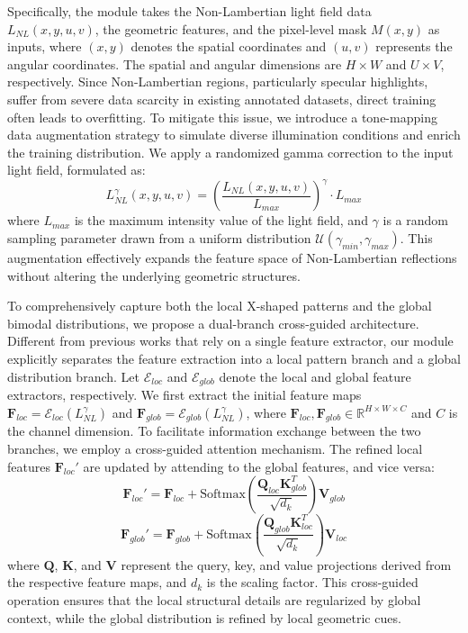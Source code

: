 Specifically, the module takes the Non-Lambertian light field data $L_{NL}(x,y,u,v)$, the geometric features, and the pixel-level mask $M(x,y)$ as inputs, where $(x,y)$ denotes the spatial coordinates and $(u,v)$ represents the angular coordinates. The spatial and angular dimensions are $H \times W$ and $U \times V$, respectively. Since Non-Lambertian regions, particularly specular highlights, suffer from severe data scarcity in existing annotated datasets, direct training often leads to overfitting. To mitigate this issue, we introduce a tone-mapping data augmentation strategy to simulate diverse illumination conditions and enrich the training distribution. We apply a randomized gamma correction to the input light field, formulated as:
\begin{equation}
\label{eq:eq10}
L_{NL}^{\gamma}(x,y,u,v) = \left( \frac{L_{NL}(x,y,u,v)}{L_{max}} \right)^{\gamma} \cdot L_{max}
\end{equation}
where $L_{max}$ is the maximum intensity value of the light field, and $\gamma$ is a random sampling parameter drawn from a uniform distribution $\mathcal{U}(\gamma_{min}, \gamma_{max})$. This augmentation effectively expands the feature space of Non-Lambertian reflections without altering the underlying geometric structures.

To comprehensively capture both the local X-shaped patterns and the global bimodal distributions, we propose a dual-branch cross-guided architecture. Different from previous works that rely on a single feature extractor, our module explicitly separates the feature extraction into a local pattern branch and a global distribution branch. Let $\mathcal{E}_{loc}$ and $\mathcal{E}_{glob}$ denote the local and global feature extractors, respectively. We first extract the initial feature maps $\mathbf{F}_{loc} = \mathcal{E}_{loc}(L_{NL}^{\gamma})$ and $\mathbf{F}_{glob} = \mathcal{E}_{glob}(L_{NL}^{\gamma})$, where $\mathbf{F}_{loc}, \mathbf{F}_{glob} \in \mathbb{R}^{H \times W \times C}$ and $C$ is the channel dimension. To facilitate information exchange between the two branches, we employ a cross-guided attention mechanism. The refined local features $\mathbf{F}_{loc}'$ are updated by attending to the global features, and vice versa:
\begin{equation}
\label{eq:eq11}
\mathbf{F}_{loc}' = \mathbf{F}_{loc} + \text{Softmax}\left(\frac{\mathbf{Q}_{loc}\mathbf{K}_{glob}^T}{\sqrt{d_k}}\right)\mathbf{V}_{glob}
\end{equation}
\begin{equation}
\label{eq:eq12}
\mathbf{F}_{glob}' = \mathbf{F}_{glob} + \text{Softmax}\left(\frac{\mathbf{Q}_{glob}\mathbf{K}_{loc}^T}{\sqrt{d_k}}\right)\mathbf{V}_{loc}
\end{equation}
where $\mathbf{Q}$, $\mathbf{K}$, and $\mathbf{V}$ represent the query, key, and value projections derived from the respective feature maps, and $d_k$ is the scaling factor. This cross-guided operation ensures that the local structural details are regularized by global context, while the global distribution is refined by local geometric cues.

